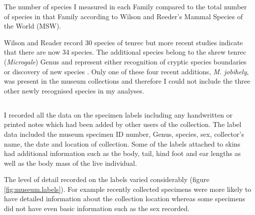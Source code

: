 
\begin{table}[h]
	\caption[Species measured] 
	{The number of species I measured in each Family compared to the total number of species in that Family according to Wilson and Reeder's Mammal Species of the World  \citeyear{Wilson2005} (MSW).}
		
	\label{tab:species.measured}
\end{table}
 
Wilson and Reader \citeyearpar{Wilson2005} record 30 species of tenrec but more recent studies indicate that there are now 34 species\citep{Olson2013}. The additional species belong to the shrew tenrec (\textit{Microgale}) Genus and represent either recognition of cryptic species boundaries \citep{Olson2004} or discovery of new species \citep{Goodman2006, Olson2009}. Only one of these four recent additions, \textit{M. jobihely}, was present in the museum collections and therefore I could not include the three other newly recognised species in my analyses.




\subsection{}

	I recorded all the data on the specimen labels including any handwritten or printed notes which had been added by other users of the collection. The label data included the museum specimen ID number, Genus, species, sex, collector's name, the date and location of collection. Some of the labels attached to skins had additional information such as the body, tail, hind foot and ear lengths as well as the body mass of the live individual. 
	
	The level of detail recorded on the labels varied considerably (figure \ref{fig:museum.labels}). For example recently collected specimens were more likely to have detailed information about the collection location whereas some specimens did not have even basic information such as the sex recorded. 


